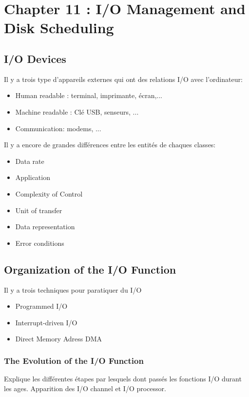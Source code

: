 
\section{Chapter 11 : I/O Management and Disk Scheduling}

\subsection{I/O Devices}
Il y a trois type d'appareils externes qui ont des relations I/O avec l'ordinateur:
\begin{itemize}
  \item Human readable : terminal, imprimante, écran,...
  \item Machine readable : Clé USB, senseurs, ...
  \item Communication: modems, ...
\end{itemize}
Il y a encore de grandes différences entre les entités de chaques classes:
\begin{itemize}
  \item Data rate
  \item Application
  \item Complexity of Control
  \item Unit of transfer
  \item Data representation
  \item Error conditions
\end{itemize}

\subsection{Organization of the I/O Function}
Il y a trois techniques pour paratiquer du I/O
\begin{itemize}
  \item Programmed I/O
  \item Interrupt-driven I/O
  \item Direct Memory Adress DMA
\end{itemize}

\subsubsection{The Evolution of the I/O Function}
Explique les différentes étapes par lesquels dont passés les fonctions I/O durant les ages.
Apparition des I/O channel et I/O processor.


